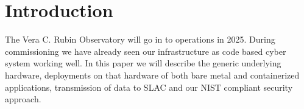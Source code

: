 \section{Introduction}

The Vera C. Rubin Observatory\cite{2019ApJ...873..111I} will go in to operations in 2025.
During commissioning we have already seen our infrastructure as code based cyber system working well.
In this paper we will describe the generic underlying hardware, deployments on that hardware of both bare metal and containerized applications, transmission of data to SLAC and our NIST\cite{NIST.SP.800-171r3} compliant security approach.



